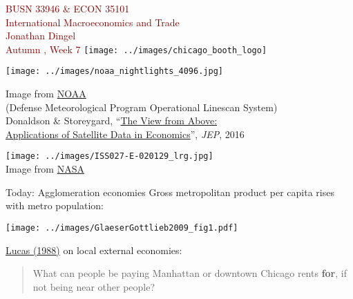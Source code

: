 \documentclass[10pt,notes=hide]{beamer}
\begin{document}
\begin{frame}[plain]
\begin{center}
\large
\textcolor{maroon}{BUSN 33946 \& ECON 35101\\
International Macroeconomics and Trade\\ 
Jonathan Dingel\\
Autumn \the\year, Week 7}
\vfill 
\texttt{[image: ../images/chicago\_booth\_logo]}
\end{center}
\end{frame}
\begin{frame}[plain]
\begin{center}
\texttt{[image: ../images/noaa\_nightlights\_4096.jpg]} \\
{\small
Image from \href{ftp://public.sos.noaa.gov/land/earth_night/nightlights/4096.jpg}{NOAA} \\
(Defense Meteorological Program Operational Linescan System)\\
Donaldson \& Storeygard, ``\href{https://www.aeaweb.org/articles?id=10.1257/jep.30.4.171}{The View from Above: \\ Applications of Satellite Data in Economics}'', \textit{JEP}, 2016
\par}
\end{center}
\end{frame}
\begin{frame}[plain]
\begin{center}
\texttt{[image: ../images/ISS027-E-020129\_lrg.jpg]} \\
Image from \href{https://visibleearth.nasa.gov/view.php?id=50671
}{NASA}
\end{center}
\end{frame}
\begin{frame}{Today: Agglomeration economies}
Gross metropolitan product per capita rises with metro population:
\begin{center}
\texttt{[image: ../images/GlaeserGottlieb2009\_fig1.pdf]}
\end{center}
\href{https://www.sciencedirect.com/science/article/pii/0304393288901687}{Lucas (1988)} on local external economies:
\begin{quote}
What can people be paying Manhattan or downtown Chicago rents \textbf{for}, if not being near other people?\par
\end{quote}
\end{frame}
\end{document}

